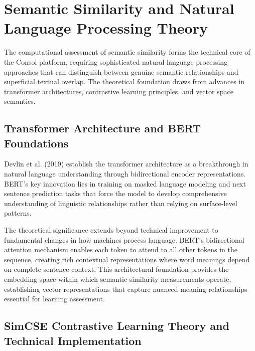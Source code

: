 
{\color{maroon}
\section{Semantic Similarity and Natural Language Processing Theory}

The computational assessment of semantic similarity forms the technical core of the Consol platform, requiring sophisticated natural language processing approaches that can distinguish between genuine semantic relationships and superficial textual overlap. The theoretical foundation draws from advances in transformer architectures, contrastive learning principles, and vector space semantics.

\subsection{Transformer Architecture and BERT Foundations}

Devlin et al. (2019) establish the transformer architecture as a breakthrough in natural language understanding through bidirectional encoder representations. BERT's key innovation lies in training on masked language modeling and next sentence prediction tasks that force the model to develop comprehensive understanding of linguistic relationships rather than relying on surface-level patterns.

The theoretical significance extends beyond technical improvement to fundamental changes in how machines process language. BERT's bidirectional attention mechanism enables each token to attend to all other tokens in the sequence, creating rich contextual representations where word meanings depend on complete sentence context. This architectural foundation provides the embedding space within which semantic similarity measurements operate, establishing vector representations that capture nuanced meaning relationships essential for learning assessment.

{\color{maroon}
\subsection{SimCSE Contrastive Learning Theory and Technical Implementation}

}}
